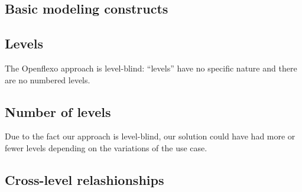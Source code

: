 
  \subsection{Basic modeling constructs}


  \subsection{Levels}


  The Openflexo approach is level-blind: ``levels'' have no specific
  nature and there are no numbered levels. 

  \subsection{Number of levels}

  Due to the fact our approach is level-blind, our solution could have had more
  or fewer levels depending on the variations of the use case. %

  \subsection{Cross-level relashionships}


